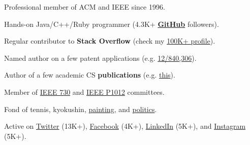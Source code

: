 \documentclass{yb}
\begin{document}
Professional member of ACM and IEEE since 1996.

Hands-on Java/C++/Ruby programmer
  (4.3K+ \textbf{\href{https://github.com/yegor256}{GitHub}} followers).

Regular contributor to \textbf{Stack Overflow}
  (check my \href{https://stackexchange.com/users/63162/yegor256}{100K+ profile}).

Named author on a few patent applications
  (e.g. \href{https://www.google.com/patents/US20120023476}{12/840,306}).

Author of a few academic CS \textbf{publications}
  (e.g. \href{https://link.springer.com/chapter/10.1007/978-3-642-02152-7_6}{this}).

Member of \href{http://standards.ieee.org/develop/wg/730.html}{IEEE 730} and
  \href{https://standards.ieee.org/ieee/1012/7324/}{IEEE P1012} committees.

Fond of
  tennis,
  kyokushin,
  \href{https://www.yegor256.com/paintings.html}{painting},
  and
  \href{https://ru.yegor256.com}{politics}.

Active on
  \href{https://twitter.com/intent/follow?screen_name=yegor256}{Twitter} (13K+),
  \href{https://www.facebook.com/yegor256}{Facebook} (4K+),
  \href{https://www.linkedin.com/in/yegor256}{LinkedIn} (5K+),
  and
  \href{https://instagram.com/yegor256}{Instagram} (5K+).
\end{document}
